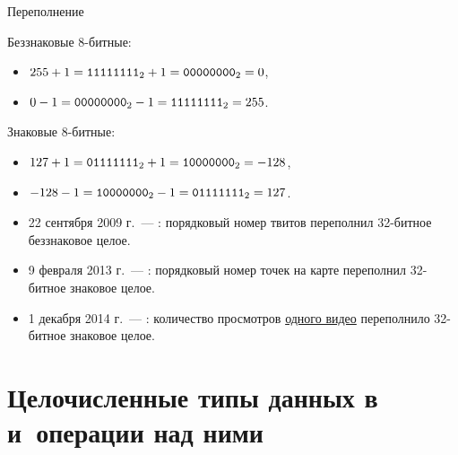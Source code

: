 \begin{frame}{Переполнение}

  \begin{block}{Беззнаковые 8-битные:}
    \begin{itemize}
      \item $255 + 1 = \mathtt{1111 1111}_2 + 1 = \mathtt{0000 0000}_2 = 0$,
      \item $0 - 1 = \mathtt{0000 0000}_2 - 1 = \mathtt{1111 1111}_2 = 255$.
    \end{itemize}
  \end{block}

  \begin{block}{Знаковые 8-битные:}
    \begin{itemize}
      \item $127 + 1 = \mathtt{0111 1111}_2 + 1 = \mathtt{1000 0000}_2 = -128$,
      \item $-128 - 1 = \mathtt{1000 0000}_2 - 1 = \mathtt{0111 1111}_2 = 127$.
    \end{itemize}
  \end{block}


\end{frame}

\begin{frame}{}

  \begin{itemize}
    \pause
    \item 22 сентября 2009 г.~--- : порядковый номер твитов
      переполнил 32-битное беззнаковое целое.
    \pause
    \item 9 февраля 2013 г.~--- : порядковый номер точек на
      карте переполнил 32-битное знаковое целое.
    \pause
    \item 1 декабря 2014 г.~--- : количество просмотров
      \href{https://www.youtube.com/watch?v=9bZkp7q19f0}{одного видео}
      переполнило 32-битное знаковое целое.
  \end{itemize}


\end{frame}

\section{Целочисленные типы данных в  и~операции над ними}

